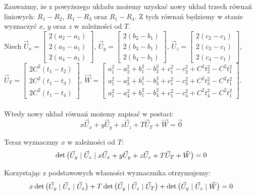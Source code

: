 \documentclass[]{mwart}
\theoremstyle{definition}
\newcommand{\matsp}{\hspace*{1mm} | \hspace*{1mm}}
\begin{document}
Zauważmy, że z powyższego układu możemy uzyskać nowy układ trzech równań liniowych: $R_1 - R_2$, $R_1 - R_3$ oraz $R_1 - R_4$. Z tych równań będziemy w stanie wyznaczyć
$x$, $y$ oraz $z$ w zależności od $T$.\\

Niech $\vec U_x =
				\begin{bmatrix}
					2(a_2-a_1) \\ 2(a_3-a_1) \\ 2(a_4-a_1)
				\end{bmatrix}$,
			$\vec U_y =
				\begin{bmatrix}
					2(b_2-b_1) \\ 2(b_3-b_1) \\ 2(b_4-b_1)
				\end{bmatrix}$,
			$\vec U_z =
				\begin{bmatrix}
					2(c_2-c_1) \\ 2(c_3-c_1) \\ 2(c_4-c_1)
				\end{bmatrix}$, \\
			\hspace*{12mm}
			$\vec U_T =
				\begin{bmatrix}
					2C^2(t_1-t_2) \\ 2C^2(t_1-t_3) \\ 2C^2(t_1-t_4)
				\end{bmatrix}$,
			$\vec W =
				\begin{bmatrix}
					a_{1}^{2} - a_{2}^{2} + b_{1}^{2} - b_{2}^{2} + c_{1}^{2} - c_{2}^{2} + C^2t_{2}^{2} - C^2t_{1}^{2} \\
					a_{1}^{2} - a_{3}^{2} + b_{1}^{2} - b_{3}^{2} + c_{1}^{2} - c_{3}^{2} + C^2t_{3}^{2} - C^2t_{1}^{2} \\
					a_{1}^{2} - a_{4}^{2} + b_{1}^{2} - b_{4}^{2} + c_{1}^{2} - c_{4}^{2} + C^2t_{4}^{2} - C^2t_{1}^{2}
				\end{bmatrix}$.
\\ \\

Wtedy nowy układ równań możemy zapisać w postaci:
\[ x \vec U_x + y \vec U_y + z \vec U_z + T \vec U_T + \vec W = \vec 0 \]

Teraz wyznaczmy $x$ w zależności od $T$:
\[
	\det
		\begin{pmatrix}
			\vec U_y \matsp
			\vec U_z \matsp
			x \vec U_x + y \vec U_y + z \vec U_z + T \vec U_T + \vec W
		\end{pmatrix} = 0
\]

Korzystając z podstawowych własności wyznacznika otrzymujemy:
\[
	x \det
		\begin{pmatrix}
			\vec U_y \matsp
			\vec U_z \matsp
			\vec U_x
		\end{pmatrix}
	+ T \det
		\begin{pmatrix}
			\vec U_y \matsp
			\vec U_z \matsp
			\vec U_T
		\end{pmatrix}
		+ \det
			\begin{pmatrix}
				\vec U_y \matsp
				\vec U_z \matsp
				\vec W
			\end{pmatrix}
		=0
\]
\end{document}
